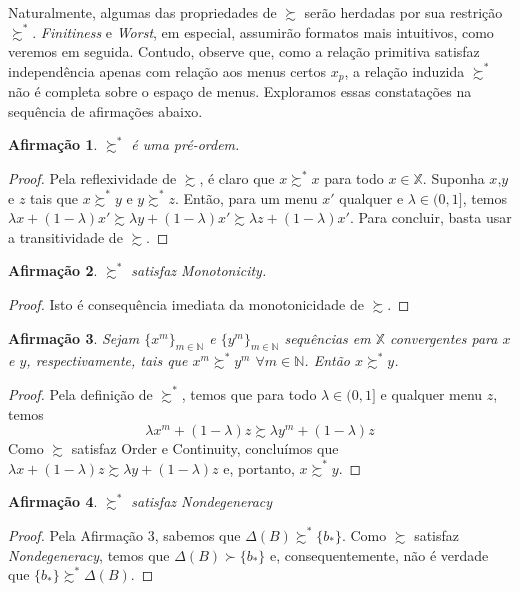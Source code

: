 \documentclass[12pt, a4paper]{article}
\theoremstyle{nonumberplain}
\newtheorem{proof}{Dem.}
\theoremstyle{plain}
\theoremstyle{plain}
\newtheorem{claim}{Afirmação}
\theoremstyle{plain}
\theoremstyle{nonumberplain}
\begin{document}
Naturalmente, algumas das propriedades de $\succsim$ serão herdadas por sua restrição $\succsim^*$. \textit{Finitiness} e \textit{Worst}, em especial, assumirão formatos mais intuitivos, como veremos em seguida. Contudo, observe que, como a relação primitiva satisfaz independência apenas com relação aos menus certos $x_p$, a relação induzida $\succsim^*$ não é completa sobre o espaço de menus. Exploramos essas constatações na sequência de afirmações abaixo.

\begin{claim}$\succsim^*$ é uma pré-ordem. \end{claim}
\begin{proof} Pela reflexividade de $\succsim$, é claro que $x\succsim^* x$ para todo $x\in \mathbb{X}$. Suponha $x$,$y$ e $z$ tais que $x\succsim^* y$ e $y\succsim^* z$. Então, para um menu $x'$ qualquer e $\lambda\in(0,1]$, temos $\lambda x + (1-\lambda)x'\succsim \lambda y + (1-\lambda)x'\succsim \lambda z + (1-\lambda)x'$. Para concluir, basta usar a transitividade de $\succsim$.
\end{proof}
\begin{claim}\label{monotonicidade}$\succsim^*$ satisfaz Monotonicity. \end{claim}
\begin{proof}
Isto é consequência imediata da monotonicidade de $\succsim$.
\end{proof}
\begin{claim}\label{continuidade} Sejam $\{x^m\}_{m\in\mathbb{N}}$ e $\{y^m\}_{m\in\mathbb{N}}$ sequências em $\mathbb{X}$ convergentes para $x$ e $y$, respectivamente, tais que $x^m\succsim^* y^m$ $\forall m\in \mathbb{N}$. Então $x\succsim^* y$.\end{claim}
\begin{proof}
Pela definição de $\succsim^*$, temos que para todo $\lambda\in (0,1]$ e qualquer menu $z$, temos $$\lambda x^m + (1-\lambda)z \succsim \lambda y^m + (1-\lambda)z$$ Como $\succsim$ satisfaz Order e Continuity, concluímos que $\lambda x + (1-\lambda)z \succsim \lambda y + (1-\lambda)z$ e, portanto, $x\succsim^* y$.
\end{proof}
\begin{claim}$\succsim^*$ satisfaz \emph{Nondegeneracy}\end{claim}
\begin{proof}
Pela Afirmação 3, sabemos que $\Delta(B)\succsim^* \{b_*\}$. Como $\succsim$ satisfaz \emph{Nondegeneracy}, temos que $\Delta(B)\succ \{b_*\}$ e, consequentemente, não é verdade que $\{b_*\}\succsim^*\Delta(B)$.
\end{proof}
\end{document}
